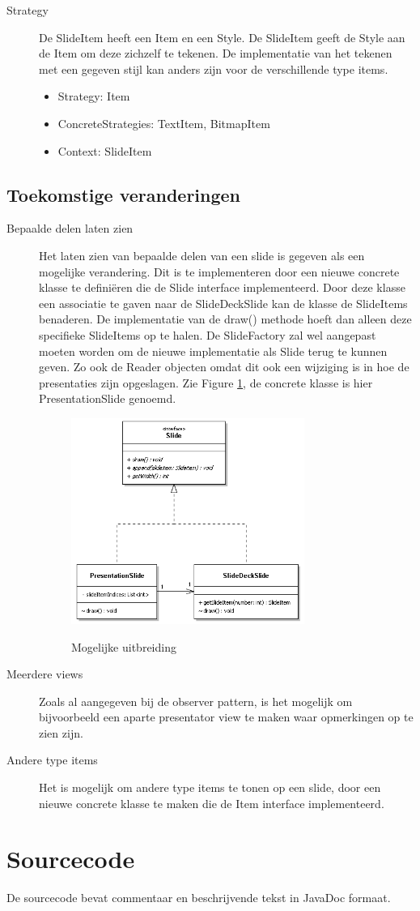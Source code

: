 \documentclass[a4paper]{article}
\begin{document}
\begin{description}
\item[Strategy] De SlideItem heeft een Item en een Style. De SlideItem geeft de Style aan de Item om deze zichzelf te tekenen. De implementatie van het tekenen met een gegeven stijl kan anders zijn voor de verschillende type items.
\begin{itemize}
\item Strategy: Item
\item ConcreteStrategies: TextItem, BitmapItem
\item Context: SlideItem
\end{itemize}

\end{description}
\subsection{Toekomstige veranderingen}
\begin{description}
\item[Bepaalde delen laten zien] Het laten zien van bepaalde delen van een slide is gegeven als een mogelijke verandering. Dit is te implementeren door een nieuwe concrete klasse te definiëren die de Slide interface implementeerd. Door deze klasse een associatie te gaven naar de SlideDeckSlide kan de klasse de SlideItems benaderen. De implementatie van de draw() methode hoeft dan alleen deze specifieke SlideItems op te halen. De SlideFactory zal wel aangepast moeten worden om de nieuwe implementatie als Slide terug te kunnen geven. Zo ook de Reader objecten omdat dit ook een wijziging is in hoe de presentaties zijn opgeslagen. Zie Figure \ref{fig:mogelijkeuitbreiding}, de concrete klasse is hier PresentationSlide genoemd.
\begin{figure}[htbp]
\caption{Mogelijke uitbreiding}
\centering
\includegraphics[width=0.75\textwidth]{MogelijkeUitbreiding.PNG}
\label{fig:mogelijkeuitbreiding}
\end{figure}
\item[Meerdere views] Zoals al aangegeven bij de observer pattern, is het mogelijk om bijvoorbeeld een aparte presentator view te maken waar opmerkingen op te zien zijn.
\item[Andere type items] Het is mogelijk om andere type items te tonen op een slide, door een nieuwe concrete klasse te maken die de Item interface implementeerd.
\end{description}


\section{Sourcecode}
De sourcecode bevat commentaar en beschrijvende tekst in JavaDoc formaat.
\end{document}
